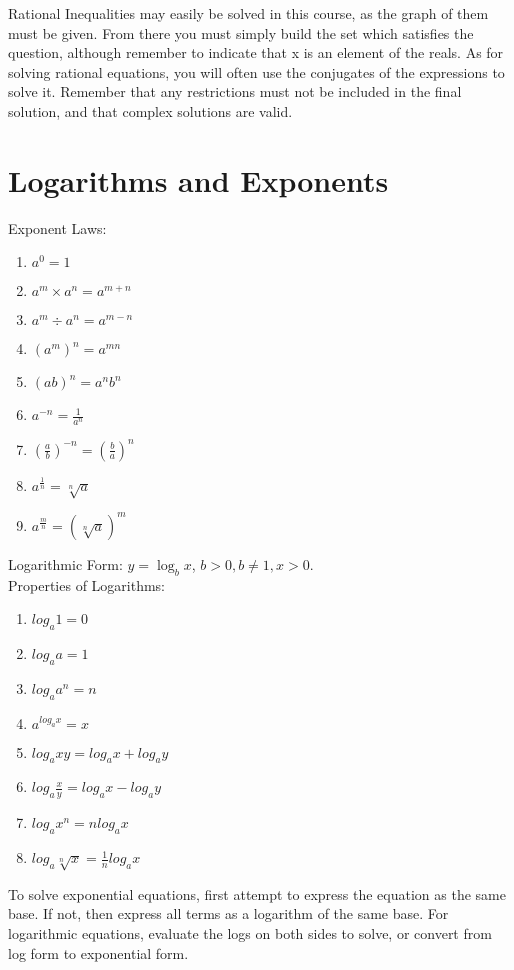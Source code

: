 \documentclass{article}
\begin{document}
Rational Inequalities may easily be solved in this course, as the graph of them must be given. From there you must simply build the set which satisfies the question, although remember to indicate that x is an element of the reals. As for solving rational equations, you will often use the conjugates of the expressions to solve it. Remember that any restrictions must not be included in the final solution, and that complex solutions are valid.

\section{Logarithms and Exponents}

Exponent Laws: \begin{enumerate}
    \item $a^0=1$
    \item $a^m \times a^n = a^{m+n}$
    \item $a^m \div a^n = a^{m-n}$
    \item $(a^m)^n=a^{mn}$
    \item $(ab)^n = a^nb^n$
    \item $a^{-n}=\frac{1}{a^n}$
    \item $(\frac{a}{b})^{-n}=(\frac{b}{a})^n$
    \item $a^{\frac{1}{n}}=\sqrt[n]{a}$
    \item $a^{\frac{m}{n}}=(\sqrt[n]{a})^m$
\end{enumerate}

Logarithmic Form: $y=\log_{b}x$, $b > 0, b\neq 1, x > 0$. \\

Properties of Logarithms: \begin{enumerate}
    \item $log_{a}1 = 0$
    \item $log_{a}a=1$
    \item $log_{a}a^n=n$
    \item $a^{log_{a}x}=x$
    \item $log_{a}xy=log_{a}x+log_{a}y$
    \item $log_{a}\frac{x}{y}=log_{a}x-log_{a}y$
    \item $log_{a}x^n=nlog_{a}x$
    \item $log_{a}\sqrt[n]{x}=\frac{1}{n}log_{a}x$
\end{enumerate}

To solve exponential equations, first attempt to express the equation as the same base. If not, then express all terms as a logarithm of the same base. For logarithmic equations, evaluate the logs on both sides to solve, or convert from log form to exponential form. \\
\end{document}
